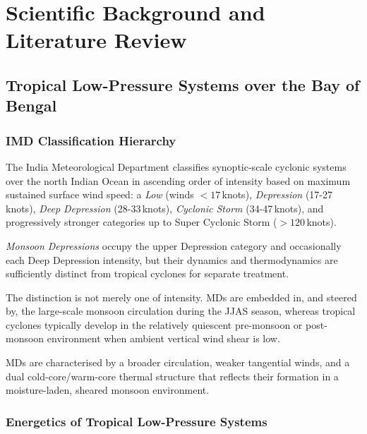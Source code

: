 
\ifpdf
\graphicspath{{Chapter2/Figs/Raster/}{Chapter2/Figs/PDF/}{Chapter2/Figs/}}
\else
\graphicspath{{Chapter2/Figs/Vector/}{Chapter2/Figs/}}
\fi

\chapter{Scientific Background and Literature Review}
\label{ch:background}
\section{Tropical Low-Pressure Systems over the Bay of Bengal}
\label{sec:lps_overview}
\subsection{IMD Classification Hierarchy}
\label{subsec:imd_classification}

The India Meteorological Department classifies synoptic-scale
cyclonic systems over the north Indian Ocean in ascending order of
intensity based on maximum sustained surface wind speed: a \emph{Low}
(winds $<17$\,knots), \emph{Depression} (17-27\,knots), \emph{Deep
Depression} (28-33\,knots), \emph{Cyclonic Storm} (34-47\,knots), and
progressively stronger categories up to Super Cyclonic Storm ($>120$\,knots).

\emph{Monsoon Depressions} occupy the upper Depression category and
occasionally each Deep Depression intensity, but their dynamics and
thermodynamics are sufficiently distinct from tropical cyclones for
separate treatment.

The distinction is not merely one of intensity. MDs are embedded in,
and steered by, the large-scale monsoon circulation during the JJAS
season, whereas tropical cyclones typically develop in the relatively
quiescent pre-monsoon or post-monsoon environment when ambient
vertical wind shear is low.

MDs are characterised by a broader circulation, weaker tangential
winds, and a dual cold-core/warm-core thermal structure
\citep{rashid2005track} that reflects their formation in a
moisture-laden, sheared monsoon environment.

\subsection{Energetics of Tropical Low-Pressure Systems}
\label{subsec:lps_energetics}

